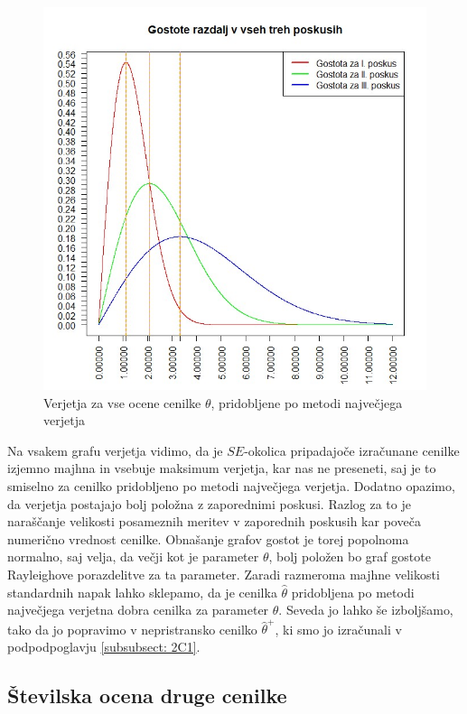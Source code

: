 \documentclass[a4paper, 10pt]{article}
\begin{document}
	\begin{figure}[h!]
		\label{fig: 2Dplot4}
		\centering
		\includegraphics[scale = 0.35]{VerjetjeMNV4}
		\caption{Verjetja za vse ocene cenilke $\theta$, pridobljene po metodi največjega verjetja}
	\end{figure}
	
	Na vsakem grafu verjetja vidimo, da je $SE$-okolica pripadajoče izračunane cenilke izjemno majhna in vsebuje maksimum verjetja, kar nas ne preseneti, saj je to smiselno za cenilko pridobljeno po metodi največjega verjetja. Dodatno opazimo, da verjetja postajajo bolj položna z zaporednimi poskusi. Razlog za to je naraščanje velikosti posameznih meritev v zaporednih poskusih kar poveča numerično vrednost cenilke. Obnašanje grafov gostot je torej popolnoma normalno, saj velja, da večji kot je parameter $\theta$, bolj položen bo graf gostote Rayleighove porazdelitve za ta parameter. 
	Zaradi razmeroma majhne velikosti standardnih napak lahko sklepamo, da je cenilka $\widehat{\theta}$ pridobljena po metodi največjega verjetna dobra cenilka za parameter $\theta$. Seveda jo lahko še izboljšamo, tako da jo popravimo v nepristransko cenilko $\widehat{\theta}^{+}$, ki smo jo izračunali v podpodpoglavju \ref{subsubsect: 2C1}.
	
	\subsection{Številska ocena druge cenilke} \label{subsect: 2E}
	
\end{document}
